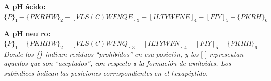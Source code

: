 \begin{adjustbox}{width=\textwidth}
\noindent \textbf{A pH ácido:} $\{P\}_1 -\{PKRHW\}_2 -[VLS(C)WFNQE]_3 -[ILTYWFNE]_4 -[FIY]_5- \{PKRH\}_6 $
\end{adjustbox}

\begin{adjustbox}{width=\textwidth}
\noindent \textbf{A pH neutro:}  $\{P\}_1 -\{PKRHW\}_2 -[VLS(C)WFNQ]_3 -[ILTYWFN]_4 -[FIY]_5- \{PKRH\}_6 $\\
\end{adjustbox}
\textit{\noindent Donde los \{\} indican residuos ``prohibidos'' en esa posición, y los} [ ] \textit{representan aquellos que son ``aceptados'', con respecto a la formación de amiloides.
Los subíndices indican las posiciones correspondientes en el hexapéptido.}


\vspace{0.2cm}
% 




